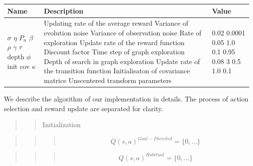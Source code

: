 \documentclass[10pt,a4paper,onecolumn]{article}
\begin{document}
\begin{longtable}[c]{@{}lll@{}}
\toprule
\begin{minipage}[b]{0.20\columnwidth}\raggedright\strut
Name
\strut\end{minipage} &
\begin{minipage}[b]{0.45\columnwidth}\raggedright\strut
Description
\strut\end{minipage} &
\begin{minipage}[b]{0.27\columnwidth}\raggedright\strut
Value
\strut\end{minipage}\tabularnewline
\midrule
\endhead
\begin{minipage}[t]{0.20\columnwidth}\raggedright\strut
\(\sigma\) \(\eta\) \(P_n\) \(\beta\) \(\rho\) \(\gamma\) \(\tau\) depth
\(\phi\) init cov \(\kappa\)
\strut\end{minipage} &
\begin{minipage}[t]{0.45\columnwidth}\raggedright\strut
Updating rate of the average reward Variance of evolution noise Variance
of observation noise Rate of exploration Update rate of the reward
function Discount factor Time step of graph exploration Depth of search
in graph exploration Update rate of the transition function
Initialisaton of covariance matrice Unscentered transform parameters
\strut\end{minipage} &
\begin{minipage}[t]{0.27\columnwidth}\raggedright\strut
0.02 0.0001 0.05 1.0 0.1 0.95 0.08 3 0.5 1.0 0.1
\strut\end{minipage}\tabularnewline
\bottomrule
\end{longtable}

We describe the algorithm of our implementation in details. The process
of action selection and reward update are separated for clarity.

\begin{quote}
\begin{quote}
Initialization
\end{quote}
\end{quote}

\begin{quote}
\begin{quote}
\begin{quote}
\[Q(s, a)^{Goal-Directed} = \{ 0, \ldots \}\]
\end{quote}
\end{quote}
\end{quote}

\begin{quote}
\begin{quote}
\begin{quote}
\[Q(s, a)^{Habitual} = \{ 0, \dots \}\]
\end{quote}
\end{quote}
\end{quote}
\end{document}
